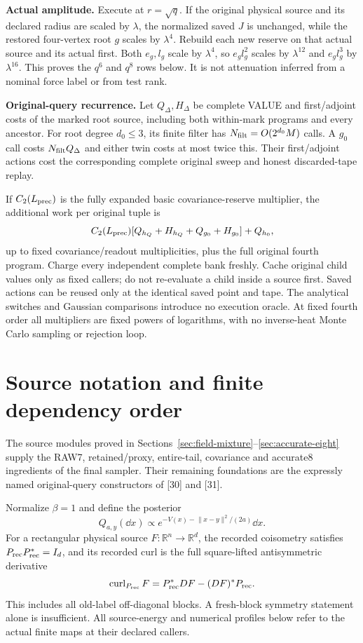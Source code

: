 \documentclass[11pt]{article}
\numberwithin{equation}{section}
\theoremstyle{remark}\newtheorem{remark}[theorem]{Remark}
\newcommand{\R}{\mathbb R}\newcommand{\E}{\mathbb E}
\newcommand{\curl}{\operatorname{curl}}
\newcommand{\norm}[1]{\lVert#1\rVert}
\newcommand{\proofstep}[1]{\par\medskip\noindent\textbf{#1.}\enspace}
\begin{document}
\proofstep{Actual amplitude}
Execute at $r=\sqrt q$. If the original physical source and its declared radius are scaled by $\lambda$, the normalized saved $J$ is unchanged, while the restored four-vertex root $g$ scales by $\lambda^4$. Rebuild each new reserve on that actual source and its actual first. Both $e_g,l_g$ scale by $\lambda^4$, so $e_gl_g^2$ scales by $\lambda^{12}$ and $e_gl_g^3$ by $\lambda^{16}$. This proves the $q^6$ and $q^8$ rows below. It is not attenuation inferred from a nominal force label or from test rank.

\proofstep{Original-query recurrence}
Let $Q_\Delta,H_\Delta$ be complete VALUE and first/adjoint costs of the marked root source, including both within-mark programs and every ancestor. For root degree $d_0\le3$, its finite filter has $N_{\rm filt}=O(2^{d_0}M)$ calls. A $g_0$ call costs $N_{\rm filt}Q_\Delta$ and either twin costs at most twice this. Their first/adjoint actions cost the corresponding complete original sweep and honest discarded-tape replay.

If $C_2(L_{\rm prec})$ is the fully expanded basic covariance-reserve multiplier, the additional work per original tuple is
\begin{equation}\label{eq:query-local}
 C_2(L_{\rm prec})
  [Q_{h_Q}+H_{h_Q}+Q_{g_0}+H_{g_0}]+Q_{h_0},
\end{equation}
up to fixed covariance/readout multiplicities, plus the full original fourth program. Charge every independent complete bank freshly. Cache original child values only as fixed callers; do not re-evaluate a child inside a source first. Saved actions can be reused only at the identical saved point and tape. The analytical switches and Gaussian comparisons introduce no execution oracle. At fixed fourth order all multipliers are fixed powers of logarithms, with no inverse-heat Monte Carlo sampling or rejection loop.

\section{Source notation and finite dependency order}
\label{sec:source-definitions}
The source modules proved in Sections~\ref{sec:field-mixture}--\ref{sec:accurate-eight} supply the RAW7, retained/proxy, entire-tail, covariance and accurate8 ingredients of the final sampler. Their remaining foundations are the expressly named original-query constructors of [30] and [31].

Normalize $\beta=1$ and define the posterior
\[
 Q_{a,y}(\dd x)\propto
 e^{-V(x)-\norm{x-y}^2/(2a)}\dd x.
\]
For a rectangular physical source $F:\R^n\to\R^d$, the recorded coisometry satisfies $P_{\rm rec}P_{\rm rec}^*=I_d$, and its recorded curl is the full square-lifted antisymmetric derivative
\[
 \curl_{P_{\rm rec}}F=P_{\rm rec}^*DF-(DF)^*P_{\rm rec}.
\]
This includes all old-label off-diagonal blocks. A fresh-block symmetry statement alone is insufficient. All source-energy and numerical profiles below refer to the actual finite maps at their declared callers.
\end{document}
